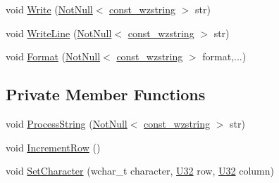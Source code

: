 \begin{DoxyCompactItemize}
\item 
void \hyperlink{classmage_1_1script_1_1_text_console_script_a46610edcf7a1707476b87ad64f1ee68d}{Write} (\hyperlink{namespacemage_a8769f9d670d6b585ea306cb1062af94b}{Not\+Null}$<$ \hyperlink{namespacemage_ac409e0f2a22292a3a4cd42742994fbf0}{const\+\_\+wzstring} $>$ str)
\item 
void \hyperlink{classmage_1_1script_1_1_text_console_script_ac8f0361bc1d703b56f1d8be43a32f0ae}{Write\+Line} (\hyperlink{namespacemage_a8769f9d670d6b585ea306cb1062af94b}{Not\+Null}$<$ \hyperlink{namespacemage_ac409e0f2a22292a3a4cd42742994fbf0}{const\+\_\+wzstring} $>$ str)
\item 
void \hyperlink{classmage_1_1script_1_1_text_console_script_a6de4d411f60dd62c507c6380ac987030}{Format} (\hyperlink{namespacemage_a8769f9d670d6b585ea306cb1062af94b}{Not\+Null}$<$ \hyperlink{namespacemage_ac409e0f2a22292a3a4cd42742994fbf0}{const\+\_\+wzstring} $>$ format,...)
\end{DoxyCompactItemize}
\subsection*{Private Member Functions}
\begin{DoxyCompactItemize}
\item 
void \hyperlink{classmage_1_1script_1_1_text_console_script_a9c990e0256f01eb4cc1622bf346f32a5}{Process\+String} (\hyperlink{namespacemage_a8769f9d670d6b585ea306cb1062af94b}{Not\+Null}$<$ \hyperlink{namespacemage_ac409e0f2a22292a3a4cd42742994fbf0}{const\+\_\+wzstring} $>$ str)
\item 
void \hyperlink{classmage_1_1script_1_1_text_console_script_a3d4cba4fd8a2733933a7a444c6beaf1a}{Increment\+Row} ()
\item 
void \hyperlink{classmage_1_1script_1_1_text_console_script_a18bdee79ee6f53e28f90b607c36c8188}{Set\+Character} (wchar\+\_\+t character, \hyperlink{namespacemage_a41c104c036fba3756a74e19f793eeaa1}{U32} row, \hyperlink{namespacemage_a41c104c036fba3756a74e19f793eeaa1}{U32} column)
\end{DoxyCompactItemize}
